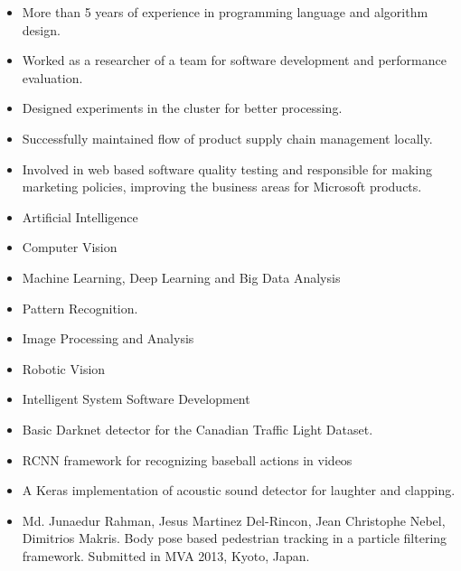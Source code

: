 \begin{itemize}
\tightlist
\item
  More than 5 years of experience in programming language and algorithm design.
\item
  Worked as a researcher of a team for software development and performance evaluation.
\item  
  Designed experiments in the cluster for better processing.
\item  
  Successfully maintained flow of product supply chain management locally. 
\item  
  Involved in web based software quality testing and responsible for making marketing policies, improving the business areas for Microsoft products. 
\end{itemize}

\begin{itemize}
\tightlist
\item
  Artificial Intelligence
\item  
  Computer Vision
\item  
  Machine Learning, Deep Learning and Big Data Analysis
\item  
  Pattern Recognition.
\item  
  Image Processing and Analysis 
\item  
  Robotic Vision
\item  
  Intelligent System Software Development 
\end{itemize}


\begin{itemize}
\tightlist
\item
  Basic Darknet detector for the Canadian Traffic Light Dataset.
\item
  RCNN framework for recognizing baseball actions in videos
\item
  A Keras implementation of acoustic sound detector for laughter and clapping.
\end{itemize}


\begin{itemize}
	\tightlist
	\item
	Md. Junaedur Rahman, Jesus Martinez Del-Rincon, Jean Christophe Nebel, Dimitrios Makris. Body pose based pedestrian tracking in a particle filtering framework. Submitted in MVA 2013, Kyoto, Japan.
\end{itemize}	

